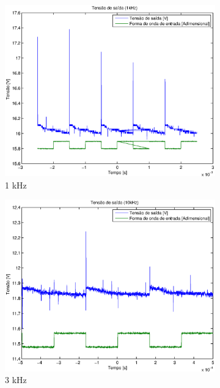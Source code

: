 \documentclass{article}
\begin{document}
\begin{figure}[H]
	\begin{subfigure}[b]{0.3\textwidth}
		\centering
		\includegraphics[width=\textwidth]{Dados/boost/t1k}
		\caption{1 kHz}
	\end{subfigure}
	\begin{subfigure}[b]{0.3\textwidth}
		\centering
		\includegraphics[width=\textwidth]{Dados/boost/t3k}
		\caption{3 kHz}
	\end{subfigure}
	\begin{subfigure}[b]{0.3\textwidth}
		\centering

\end{subfigure}
\end{figure}
\end{document}
